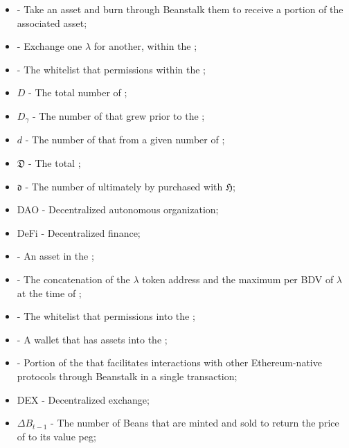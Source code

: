 \documentclass[class=article, crop=false]{standalone}
\begin{document}
\begin{itemize}[topsep=0pt, itemsep=3pt,leftmargin=16pt]
    \item[]  - \hypertarget{ht35}{Take an  asset and burn through Beanstalk them to receive a portion of the associated  asset};
    \item[]  - \hypertarget{ht36}{Exchange one  $\lambda$ for another, within the };
    \item[]  - \hypertarget{ht37}{The whitelist that permissions  within the };
    \item[] $D$ - \hypertarget{ht38}{The total number of };
    \item[] $D_{\gamma}$ - \hypertarget{ht39}{The number of  that grew prior to the };
    \item[] $d$ - \hypertarget{ht40}{The number of  that  from a given number of  \Bean};
    \item[] $\mathfrak{D}$ - \hypertarget{ht41}{The total };
    \item[] $\mathfrak{d}$ - \hypertarget{ht42}{The number of  ultimately  by  purchased with  $\mathfrak{H}$};
    \item[] DAO - \hypertarget{ht43}{Decentralized autonomous organization};
    \item[] DeFi - \hypertarget{ht44}{Decentralized finance};
    \item[]  - \hypertarget{ht45}{An asset in the };
    \item[]  - The concatenation of the \hyperlink{ht126}{$\lambda$} token address and the maximum   per BDV of \hyperlink{ht126}{$\lambda$} at the time of ;
    \item[]  - \hypertarget{ht46}{The whitelist that permissions  into the };
    \item[]  - \hypertarget{ht47}{A wallet that has  assets into the };
    \item[]  - \hypertarget{ht48}{Portion of the  that facilitates interactions with other Ethereum-native protocols through Beanstalk in a single transaction};
    \item[] DEX - Decentralized exchange;
    \item[] $\Delta B_{t-1}$ - \hypertarget{ht49}{The number of Beans that are minted and sold to return the price of  to its value peg};

\end{itemize}
\end{document}
